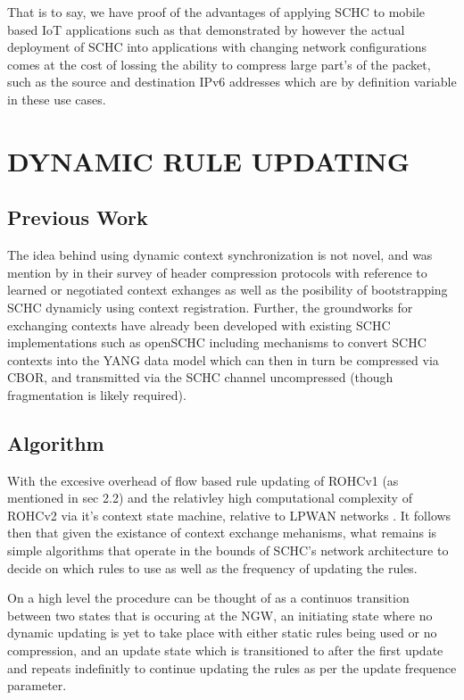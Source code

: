\documentclass[12pt]{dalthesis}
\begin{document}
		That is to say, we have proof of the advantages of applying SCHC to mobile based IoT applications such as that demonstrated by
		\cite{8355231} however the actual deployment
		of SCHC into applications with changing network configurations 
		comes at the cost of lossing the ability to compress large part's of the packet, such as 
		the source and destination IPv6 addresses which are by definition variable in these use cases.

\chapter{DYNAMIC RULE UPDATING}
	\section{Previous Work}
	\par{
		The idea behind using dynamic context synchronization is not novel, and was mention by \cite{Tomoskozi2022Packet} in their survey of 
		header compression protocols with reference to learned or negotiated context exhanges as well as the posibility of bootstrapping SCHC
		dynamicly using context registration. Further, the groundworks for exchanging contexts have already
		been 
		developed with existing SCHC implementations such as openSCHC including mechanisms to convert SCHC contexts into the YANG data model which
		can then in turn be compressed via CBOR, and transmitted via the SCHC channel uncompressed (though fragmentation
		is likely required).
	}

	\section{Algorithm}


	\par{
		With the excesive overhead of flow based rule updating of ROHCv1 \cite{GomezMontenegro2020IPv6} (as mentioned in sec 2.2) and the 
		relativley high computational complexity of ROHCv2 via it's context state machine, relative to LPWAN networks \cite{Tomoskozi2022Packet}. 
		It follows then that given the existance of context exchange mehanisms, what remains is simple algorithms that operate in the bounds of SCHC's network
		architecture to decide on which rules to use as well as the frequency
		of updating the rules. 
	}


	\par{
		On a high level the procedure can be thought of as a continuos transition between two states that is occuring at the NGW, an initiating state where 
		no dynamic updating is yet to take place with
		either static rules being used or no compression, and an update state
		which is transitioned to after the first update and repeats indefinitly to continue updating the rules as per the update frequence parameter.
	}
\end{document}

